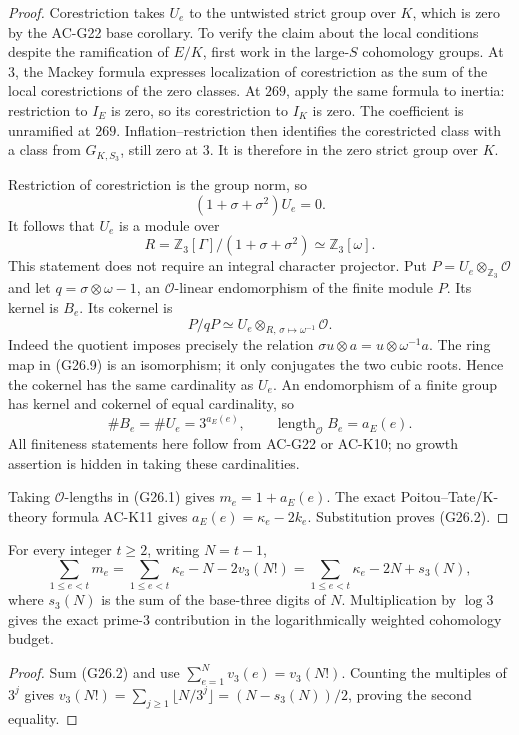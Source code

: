 \begin{proof}
Corestriction takes $U_e$ to the untwisted strict group over
$K$, which is zero by the AC-G22 base corollary.  To verify the
claim about the local conditions despite the ramification of
$E/K$, first work in the large-$S$ cohomology groups.
At $3$, the Mackey formula expresses localization of
corestriction as the sum of the local corestrictions of the zero
classes.  At $269$, apply the same formula to inertia:
restriction to $I_E$ is zero, so its corestriction to $I_K$
is zero.  The coefficient is unramified at $269$.
Inflation--restriction then identifies the corestricted class
with a class from $G_{K,S_3}$, still zero at $3$.
It is therefore in the zero strict group over $K$.

Restriction of corestriction is the group norm, so
\[
           (1+\sigma+\sigma^2)U_e=0.                  \tag{G26.8}
\]
It follows that $U_e$ is a module over
\[
 R=\mathbb Z_3[\Gamma]/(1+\sigma+\sigma^2)
        \simeq\mathbb Z_3[\omega].
\]
This statement does not require an integral character projector.
Put $P=U_e\otimes_{\mathbb Z_3}\mathcal O$ and let
$q=\sigma\otimes\omega-1$, an $\mathcal O$-linear endomorphism
of the finite module $P$.  Its kernel is $B_e$.
Its cokernel is
\[
 P/qP\simeq U_e\otimes_{R,\,\sigma\mapsto\omega^{-1}}
                        \mathcal O.                    \tag{G26.9}
\]
Indeed the quotient imposes precisely the relation
$\sigma u\otimes a=u\otimes\omega^{-1}a$.
The ring map in (G26.9) is an isomorphism; it only conjugates
the two cubic roots.  Hence the cokernel has the same cardinality
as $U_e$.  An endomorphism of a finite group has kernel and
cokernel of equal cardinality, so
\[
 \#B_e=\#U_e=3^{a_E(e)},\qquad
 \operatorname{length}_{\mathcal O}B_e=a_E(e).          \tag{G26.10}
\]
All finiteness statements here follow from AC-G22 or AC-K10;
no growth assertion is hidden in taking these cardinalities.

Taking $\mathcal O$-lengths in (G26.1) gives
$m_e=1+a_E(e)$.  The exact Poitou--Tate/K-theory formula
AC-K11 gives $a_E(e)=\kappa_e-2k_e$.  Substitution proves
(G26.2).
\end{proof}

\begin{corollary}
\label{AC-G26-sum}
For every integer $t\geq2$, writing $N=t-1$,
\[
 \sum_{1\leq e<t}m_e
 =\sum_{1\leq e<t}\kappa_e-N-2v_3(N!)
 =\sum_{1\leq e<t}\kappa_e-2N+s_3(N),                 \tag{G26.11}
\]
where $s_3(N)$ is the sum of the base-three digits of $N$.
Multiplication by $\log3$ gives the exact prime-$3$ contribution
in the logarithmically weighted cohomology budget.
\end{corollary}
\begin{proof}
Sum (G26.2) and use
$\sum_{e=1}^Nv_3(e)=v_3(N!)$.
Counting the multiples of $3^j$ gives
$v_3(N!)=\sum_{j\geq1}\lfloor N/3^j\rfloor
=(N-s_3(N))/2$, proving the second equality.
\end{proof}

